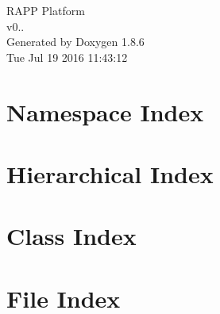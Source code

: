 \documentclass[twoside]{book}
\newcommand{\clearemptydoublepage}{%
  \newpage{\pagestyle{empty}\cleardoublepage}%
}
\begin{document}
\hypersetup{pageanchor=false}
\begin{titlepage}
\vspace*{7cm}
\begin{center}%
{\Large R\-A\-P\-P Platform \\[1ex]\large v0.. }\\
\vspace*{1cm}
{\large Generated by Doxygen 1.8.6}\\
\vspace*{0.5cm}
{\small Tue Jul 19 2016 11:43:12}\\
\end{center}
\end{titlepage}
\clearemptydoublepage
\tableofcontents
\clearemptydoublepage
{}
\hypersetup{pageanchor=true}

\chapter{Namespace Index}

\chapter{Hierarchical Index}

\chapter{Class Index}

\chapter{File Index}

\end{document}
